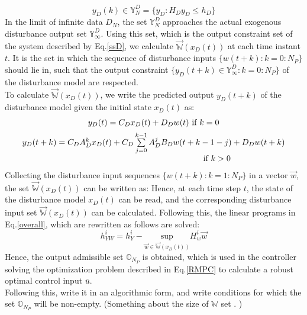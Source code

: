 \documentclass[letterpaper, 10 pt, conference]{ieeeconf}  %
\begin{document}
	\begin{equation}
	y_D(k) \in \mathbb{Y}^D_N = \{y_D:H_Dy_D \leq h_D\}
	\end{equation}
	In the limit of infinite data $D_N$, the set $\mathbb{Y}_N^D$ approaches the actual exogenous disturbance output set $\mathbb{Y}_{\infty}^D$. Using this set, which is the output constraint set of the system described by Eq.\eqref{ssD}, we calculate $\vec{\mathbb{W}}(x_D(t))$ at each time instant $t$. It is the set in which the sequence of disturbance inputs $\{w(t+k):k=0:N_P\}$ should lie in, such that the output constraint $\{y_D(t+k)\in \mathbb{Y}_{\infty}^D:k=0:N_P\}$ of the disturbance model are respected. \\
	To calculate $\vec{\mathbb{W}}(x_D(t))$, we write the predicted output $y_D(t+k)$ of the disturbance model given the initial state $x_D(t)$ as:
	\begin{equation}
	\small
	\begin{matrix}
	y_D(t)=C_Dx_D(t)+D_Dw(t) \text{ if } k=0 \vspace{5pt} \\
	y_D(t+k)=C_DA_D^{k}x_D(t)+ C_D\sum\limits_{j=0}^{k-1}A_D^jB_Dw(t+k-1-j)+D_Dw(t+k) \\ \hspace{150pt}\text{ if } k>0
	\end{matrix}
	\end{equation}
    Collecting the disturbance input sequences  $\{w(t+k):k=1:N_P\}$ in a vector $\vec{w}$, the set $\vec{\mathbb{W}}(x_D(t))$ can be written as:     
    Hence, at each time step $t$, the state of the disturbance model $x_D(t)$ can be read, and the corresponding disturbance input set $\vec{\mathbb{W}}(x_D(t))$ can be calculated. Following this, the linear programs in  Eq.\eqref{overall}, which are rewritten as follows are solved:
    \begin{equation}
    h_{YW}^i = h_Y^i-\underset{\vec{w}\in \vec{\mathbb{W}}(x_D(t))}{\text{sup}} H_w^i \vec{w}  
    \end{equation}     
    Hence, the output admissible set $\mathbb{O}_{N_P}$ is obtained, which is used in the controller solving the optimization problem described in Eq.\eqref{RMPC} to calculate a robust optimal control input $\bar{u}$.
    \\
    {\color{blue} Following this, write it in an algorithmic form, and write conditions for which the set $\mathbb{O}_{N_P}$ will be non-empty. (Something about the size of $\mathbb{W}$ set . )
}
\end{document}
